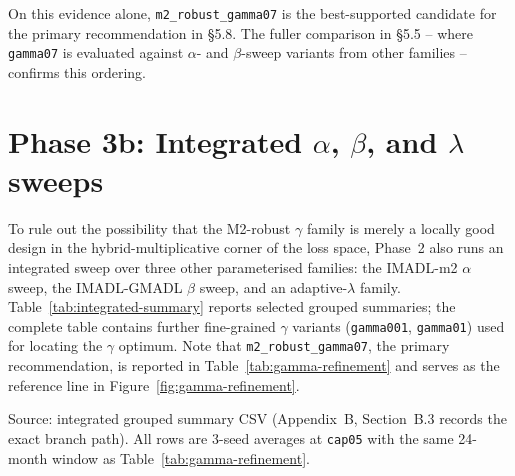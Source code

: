 On this evidence alone, \texttt{m2\_robust\_gamma07} is the best-supported candidate for the primary recommendation in \S5.8. The fuller comparison in \S5.5 -- where \texttt{gamma07} is evaluated against $\alpha$- and $\beta$-sweep variants from other families -- confirms this ordering.

\section{Phase 3b: Integrated $\alpha$, $\beta$, and $\lambda$ sweeps}

\label{sec:phase3b-integrated-sweeps}

To rule out the possibility that the M2-robust $\gamma$ family is merely a locally good design in the hybrid-multiplicative corner of the loss space, Phase~2 also runs an integrated sweep over three other parameterised families: the IMADL-m2 $\alpha$ sweep, the IMADL-GMADL $\beta$ sweep, and an adaptive-$\lambda$ family. Table~\ref{tab:integrated-summary} reports selected grouped summaries; the complete table contains further fine-grained $\gamma$ variants (\texttt{gamma001}, \texttt{gamma01}) used for locating the $\gamma$ optimum. Note that \texttt{m2\_robust\_gamma07}, the primary recommendation, is reported in Table~\ref{tab:gamma-refinement} and serves as the reference line in Figure~\ref{fig:gamma-refinement}.

Source: integrated grouped summary CSV (Appendix~B, Section~B.3 records the exact branch path). All rows are 3-seed averages at \texttt{cap05} with the same 24-month window as Table~\ref{tab:gamma-refinement}.

